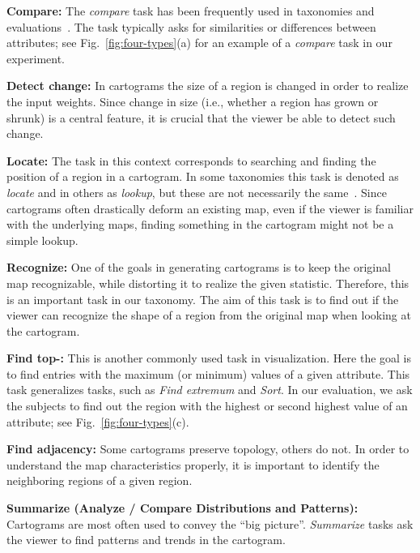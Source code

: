 \documentclass[10pt,journal,compsoc]{IEEEtran}
\begin{document}
\textbf{Compare:}
The \textit{compare} task has been frequently used in taxonomies and evaluations~\cite{Jen, RR13, Weh93}. The task typically asks for similarities or differences between attributes; see 
Fig.~\ref{fig:four-types}(a) for an example of a \textit{compare} task in our experiment.

\textbf{Detect change:} 
In cartograms the size of a region is changed in order to realize the input weights. Since change in size (i.e., whether a region has grown or shrunk) is a central feature, it is crucial that the viewer be able to detect such change.


\textbf{Locate:}
The task in this context corresponds to searching and finding the position of a region in a cartogram. In some taxonomies this task is denoted as \textit{locate} and in others as  \textit{lookup}, but these are not necessarily the same~\cite{BM13}.
Since cartograms often drastically deform an existing map, even if the viewer is familiar with the underlying maps, finding something in the cartogram might not be a simple lookup. 

\textbf{Recognize:}
One of the goals in generating cartograms is to keep the original map recognizable, while distorting it to realize the given statistic. Therefore, this is an important task in our taxonomy. The aim of this task is to find out if the viewer can recognize the shape of a region from the original map when looking at the cartogram. 

\textbf{Find top-:}
This is another commonly used task in visualization. Here the goal is to find  entries with the maximum
 (or minimum) values of a given attribute. This task generalizes tasks,
 such as \textit{Find extremum} and 
 \textit{Sort}. In our evaluation, we ask the subjects to find out the region with the highest or second highest value of an attribute; see Fig.~\ref{fig:four-types}(c).



\textbf{Find adjacency:}
Some cartograms preserve topology, others do not. In order to understand the map characteristics properly, it is important to identify the neighboring regions of a given region.

\textbf{Summarize (Analyze / Compare Distributions and Patterns):}
Cartograms are most often used to convey the ``big picture''. \textit{Summarize} tasks ask the viewer to find patterns and trends in the cartogram.





\newcommand{\plotStudy}[2]
{
	\parbox{0.235\textwidth}
	{
		\smallskip
		\hspace{-0.2cm}
		\texttt{[image: \#1.pdf]}
	}
}
\end{document}
